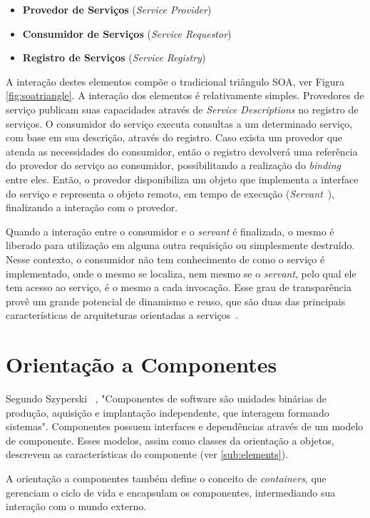 \begin{itemize}
 \item \textbf{Provedor de Serviços} (\textit{Service Provider})
 \item \textbf{Consumidor de Serviços} (\textit{Service Requestor})
 \item \textbf{Registro de Serviços} (\textit{Service Registry})
\end{itemize}

A interação destes elementos compõe o tradicional triângulo SOA, ver Figura \ref{fig:soatriangle}. A interação dos elementos é relativamente simples. Provedores de serviço publicam suas capacidades através de \textit{Service Descriptions} no registro de serviços. O consumidor do serviço executa consultas a um determinado serviço, com base em sua descrição, através do registro. Caso exista um provedor que atenda as necessidades do consumidor, então o registro devolverá uma referência do provedor do serviço ao consumidor, possibilitando a realização do \textit{binding} entre eles. Então, o provedor disponibiliza um objeto que implementa a interface do serviço e representa o objeto remoto, em tempo de execução (\textit{Servant}~\cite{volter2005remoting}), finalizando a interação com o provedor. 

Quando a interação entre o consumidor e o \textit{servant} é finalizada, o mesmo é liberado para utilização em alguma outra requisição ou simplesmente destruído. Nesse contexto, o consumidor não tem conhecimento de como o serviço é implementado, onde o mesmo se localiza, nem mesmo se o \textit{servant}, pelo qual ele tem acesso ao serviço, é o mesmo a cada invocação. Esse grau de transparência provê um grande potencial de dinamismo e reuso, que são duas das principais características de arquiteturas orientadas a serviços~\cite{davis2009open}.


\section{Orientação a Componentes}
\label{sec:component}
Segundo Szyperski ~\cite{szyperski2002component}, "Componentes de software são unidades binárias de produção, aquisição e implantação independente, que interagem formando sistemas". Componentes possuem interfaces e dependências através de um modelo de componente. Esses modelos, assim como classes da orientação a objetos, descrevem as características do componente (ver \ref{sub:elements}).

A orientação a componentes também define o conceito de \textit{containers}, que gerenciam o ciclo de vida e encapsulam os componentes, intermediando sua interação com o mundo externo.

